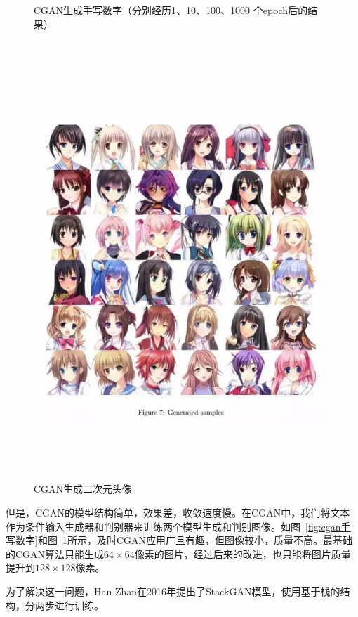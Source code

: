 \begin{figure}[htbp]
\begin{minipage}[c]{0.6\textwidth}
\begin{minipage}[c]{0.9\textwidth}
    \end{minipage}
  \caption{CGAN生成手写数字（分别经历1、10、100、1000 个epoch后的结果）} %
  \label{fig:cgan手写数字} 
  \end{minipage}
  \hfill 
  \begin{minipage}[c]{0.3\textwidth} 
  \centering%
  \centerline{\includegraphics[width=1\textwidth]{figures/moegirl.jpg}}
  \caption{CGAN生成二次元头像} 
  \label{fig:萌娘} 
  \end{minipage} 
  \end{figure}

但是，CGAN的模型结构简单，效果差，收敛速度慢。在CGAN中，我们将文本作为条件输入生成器和判别器来训练两个模型生成和判别图像。如图~\ref{fig:cgan手写数字}和图~\ref{fig:萌娘}所示，及时CGAN应用广且有趣，但图像较小，质量不高。最基础的CGAN算法只能生成$64\times64$像素的图片，经过后来的改进，也只能将图片质量提升到$128\times128$像素。

  为了解决这一问题，Han Zhan在2016年提出了StackGAN模型，使用基于栈的结构，分两步进行训练。
  

